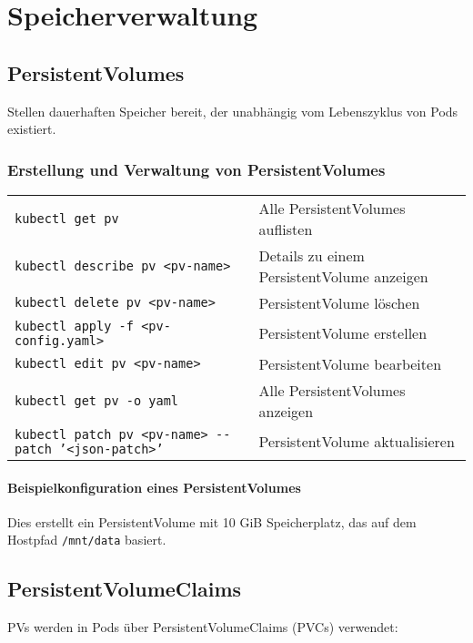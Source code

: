 \chapter{Speicherverwaltung}

\section{PersistentVolumes}
Stellen dauerhaften Speicher bereit, der unabhängig vom Lebenszyklus von Pods existiert. \\
\subsection{Erstellung und Verwaltung von PersistentVolumes}
\noindent
\begin{tabular}{|p{}|p{}|}
\hline
\texttt{kubectl get pv} & Alle PersistentVolumes auflisten \\
\texttt{kubectl describe pv <pv-name>} & Details zu einem PersistentVolume anzeigen \\
\texttt{kubectl delete pv <pv-name>} & PersistentVolume löschen \\
\texttt{kubectl apply -f <pv-config.yaml>} & PersistentVolume erstellen \\
\texttt{kubectl edit pv <pv-name>} & PersistentVolume bearbeiten \\
\texttt{kubectl get pv -o yaml} & Alle PersistentVolumes anzeigen \\
\texttt{kubectl patch pv <pv-name> {-}{-}patch '<json-patch>'} & PersistentVolume aktualisieren \\
\hline
\end{tabular}
\subsubsection{Beispielkonfiguration eines PersistentVolumes}


Dies erstellt ein PersistentVolume mit 10 GiB Speicherplatz, das auf dem Hostpfad \texttt{/mnt/data} basiert.
\section{PersistentVolumeClaims}
PVs werden in Pods über PersistentVolumeClaims (PVCs) verwendet:

